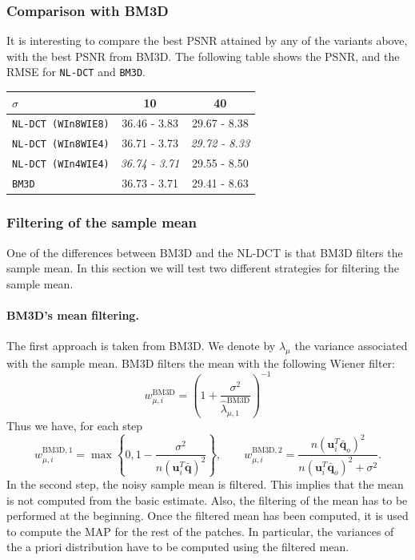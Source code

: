 \documentclass{ipol}
\newcommand{\ma}[1]{\boldsymbol{#1}}
\begin{document}
\subsubsection{Comparison with BM3D}

It is interesting to compare the best PSNR attained by any of the variants above, with the 
best PSNR from BM3D.
The following table shows the PSNR, and the RMSE for \texttt{NL-DCT} and
\texttt{BM3D}.
\begin{center}
	\begin{tabular}{l | c c }
		$\sigma$ & 10 & 40 \\\hline
		\texttt{NL-DCT (WIn8WIE8)} & 36.46 - 3.83  & 29.67 - 8.38  \\
		\texttt{NL-DCT (WIn8WIE4)} & 36.71 - 3.73  & {\it 29.72 - 8.33}  \\
		\texttt{NL-DCT (WIn4WIE4)} & {\it 36.74 - 3.71}  & 29.55 - 8.50  \\
		\texttt{BM3D}              & 36.73 - 3.71  & 29.41 - 8.63  \\
\end{tabular}
\end{center}


\clearpage
\subsubsection{Filtering of the sample mean}

One of the differences between BM3D and the NL-DCT is that BM3D filters the
sample mean. In this section we will test two different strategies for
filtering the sample mean. 

\paragraph{BM3D's mean filtering.}The first approach is taken from BM3D. We denote by $\lambda_{\mu}$ the 
variance associated with the sample mean. BM3D filters the mean with the
following Wiener filter:
\[
	w^{\text{BM3D}}_{\mu,i} = 
	\left(1 + \frac{\sigma^2}{\hat \lambda^{\text{BM3D}}_{\mu,1}}\right)^{-1}
\]
Thus we have, for each step
\[
	w^{\text{BM3D},1}_{\mu,i} = \max\left\{0, 1 - \frac{\sigma^2}{n(\ma u_i^T\bar{\ma q})^2}\right\},
	\quad\quad
	w^{\text{BM3D},2}_{\mu,i} = \frac{n(\ma u_i^T\bar{\ma q}_o)^2}{n(\ma u_i^T\bar{\ma q}_o)^2 + \sigma^2}.
\]
In the second step, the noisy sample mean is filtered. This implies that the
mean is not computed from the basic estimate.
Also, the filtering of the mean has to be performed at the beginning. Once the 
filtered mean has been computed, it is used to compute the MAP for the rest 
of the patches. In particular, the variances of the a priori distribution have
to be computed using the filtered mean.
\end{document}
